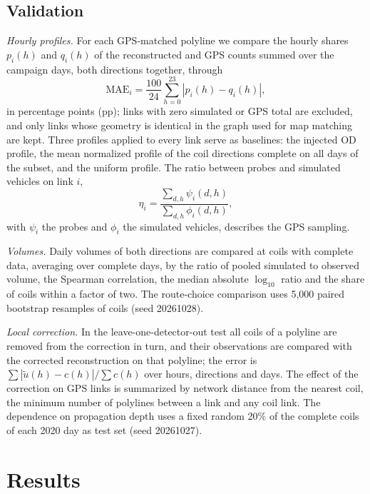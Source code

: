 \documentclass[pdflatex,Numbered]{sn-jnl}
\begin{document}
\subsection{Validation}
\label{sec:validation_methods}
\emph{Hourly profiles.} For each GPS-matched polyline we compare the hourly shares $p_i(h)$ and $q_i(h)$ of the reconstructed and GPS counts summed over the campaign days, both directions together, through
\begin{equation}
\mathrm{MAE}_i=\frac{100}{24}\sum_{h=0}^{23}|p_i(h)-q_i(h)|,
\label{eq:profile_error}
\end{equation}
in percentage points (pp); links with zero simulated or GPS total are excluded, and only links whose geometry is identical in the graph used for map matching are kept. Three profiles applied to every link serve as baselines: the injected OD profile, the mean normalized profile of the coil directions complete on all days of the subset, and the uniform profile. The ratio between probes and simulated vehicles on link $i$,
\begin{equation}
\eta_i=\frac{\sum_{d,h}\psi_i(d,h)}{\sum_{d,h}\phi_i(d,h)},
\label{eq:penetration}
\end{equation}
with $\psi_i$ the probes and $\phi_i$ the simulated vehicles, describes the GPS sampling.

\emph{Volumes.} Daily volumes of both directions are compared at coils with complete data, averaging over complete days, by the ratio of pooled simulated to observed volume, the Spearman correlation, the median absolute $\log_{10}$ ratio and the share of coils within a factor of two. The route-choice comparison uses 5,000 paired bootstrap resamples of coils (seed 20261028).

\emph{Local correction.} In the leave-one-detector-out test all coils of a polyline are removed from the correction in turn, and their observations are compared with the corrected reconstruction on that polyline; the error is $\sum|\widetilde u(h)-c(h)|/\sum c(h)$ over hours, directions and days. The effect of the correction on GPS links is summarized by network distance from the nearest coil, the minimum number of polylines between a link and any coil link. The dependence on propagation depth uses a fixed random 20\% of the complete coils of each 2020 day as test set (seed 20261027).

\section{Results}
\label{sec:results}
\end{document}
